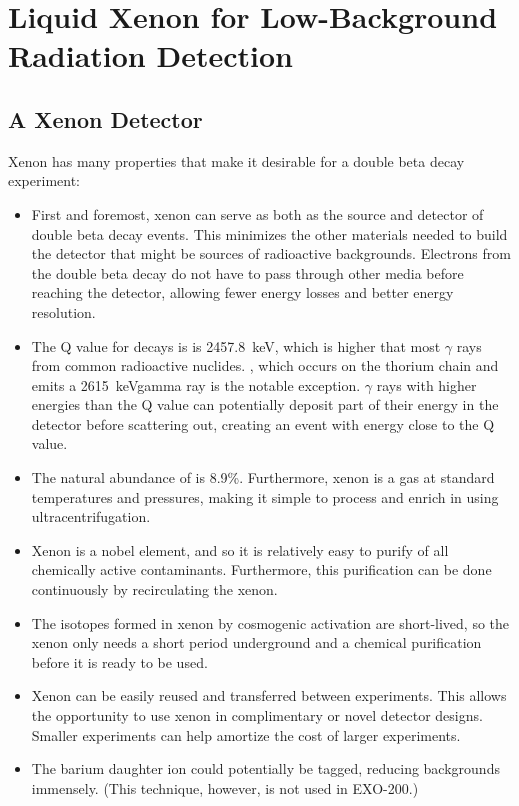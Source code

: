 \documentclass[herrin-thesis.tex]{subfiles}
\begin{document}
\chapter[LXe for Low-Background Radiation Detection]{Liquid Xenon for Low-Background Radiation Detection}
\label{ch:liquidxe}

\section{A Xenon Detector}
Xenon has many properties that make it desirable for a double beta decay experiment:
\begin{itemize}
\item First and foremost, xenon can serve as both as the source and detector of double beta decay events. This minimizes the other materials needed to build the detector that might be sources of radioactive backgrounds. Electrons from the double beta decay do not have to pass through other media before reaching the detector, allowing fewer energy losses and better energy resolution.
\item The Q value for  decays is is \SI{2457.8}{\keV}\cite{Redshaw:2007cr}, which is higher that most \(\gamma\) rays from common radioactive nuclides. , which occurs on the thorium chain and emits a \SI{2615}{\keV}gamma ray is the notable exception. \(\gamma\) rays with higher energies than the Q value can potentially deposit part of their energy in the detector before scattering out, creating an event with energy close to the Q value.
\item The natural abundance of  is 8.9\%. Furthermore, xenon is a gas at standard temperatures and pressures, making it simple to process and enrich in  using ultracentrifugation.
\item Xenon is a nobel element, and so it is relatively easy to purify of all chemically active contaminants. Furthermore, this purification can be done continuously by recirculating the xenon.
\item The isotopes formed in xenon by cosmogenic activation are short-lived, so the xenon only needs a short period underground and a chemical purification before it is ready to be used.
\item Xenon can be easily reused and transferred between experiments. This allows the opportunity to use xenon in complimentary or novel detector designs. Smaller experiments can help amortize the cost of larger experiments.
\item The barium daughter ion could potentially be tagged, reducing backgrounds immensely. (This technique, however, is not used in EXO-200.)
\end{itemize}
\end{document}
